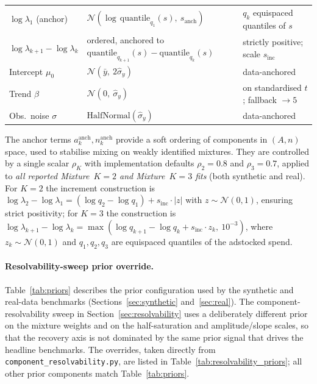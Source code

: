 \documentclass[11pt]{article}
\begin{document}
\begin{table}[ht]
\begin{tabular}{p{}p{}p{}}
$\log \lambda_1$ (anchor) & $\mathcal{N}(\log\, \text{quantile}_{q_1}(s),\ s_{\text{anch}})$ & $q_k$ equispaced quantiles of $s$ \\
$\log \lambda_{k+1} {-} \log \lambda_k$ & ordered, anchored to $\text{quantile}_{q_{k+1}}(s){-}\text{quantile}_{q_k}(s)$ & strictly positive; scale $s_{\text{inc}}$ \\
Intercept $\mu_0$ & $\mathcal{N}(\bar{y},\ 2\hat\sigma_y)$ & data-anchored \\
Trend $\beta$ & $\mathcal{N}(0,\ \hat\sigma_y)$ & on standardised $t$; fallback $\to 5$ \\
Obs.\ noise $\sigma$ & $\text{HalfNormal}(\hat\sigma_y)$ & data-anchored \\
\bottomrule
\end{tabular}
\end{table}

\noindent The anchor terms $a^{\text{anch}}_k, n^{\text{anch}}_k$ provide a soft ordering of components in $(A, n)$ space, used to stabilise mixing on weakly identified mixtures. They are controlled by a single scalar $\rho_K$ with implementation defaults $\rho_2 = 0.8$ and $\rho_3 = 0.7$, applied to \emph{all reported Mixture~$K=2$ and Mixture~$K=3$ fits} (both synthetic and real). For $K=2$ the increment construction is $\log\lambda_2 - \log\lambda_1 = (\log q_2 - \log q_1) + s_{\text{inc}} \cdot |z|$ with $z \sim \mathcal{N}(0,1)$, ensuring strict positivity; for $K=3$ the construction is $\log\lambda_{k+1} - \log\lambda_k = \max(\log q_{k+1} - \log q_k + s_{\text{inc}} \cdot z_k,\ 10^{-3})$, where $z_k \sim \mathcal{N}(0,1)$ and $q_1, q_2, q_3$ are equispaced quantiles of the adstocked spend.

\paragraph{Resolvability-sweep prior override.} Table~\ref{tab:priors} describes the prior configuration used by the synthetic and real-data benchmarks (Sections~\ref{sec:synthetic} and~\ref{sec:real}). The component-resolvability sweep in Section~\ref{sec:resolvability} uses a deliberately different prior on the mixture weights and on the half-saturation and amplitude/slope scales, so that the recovery axis is not dominated by the same prior signal that drives the headline benchmarks. The overrides, taken directly from \texttt{component\_resolvability.py}, are listed in Table~\ref{tab:resolvability_priors}; all other prior components match Table~\ref{tab:priors}.
\end{document}
